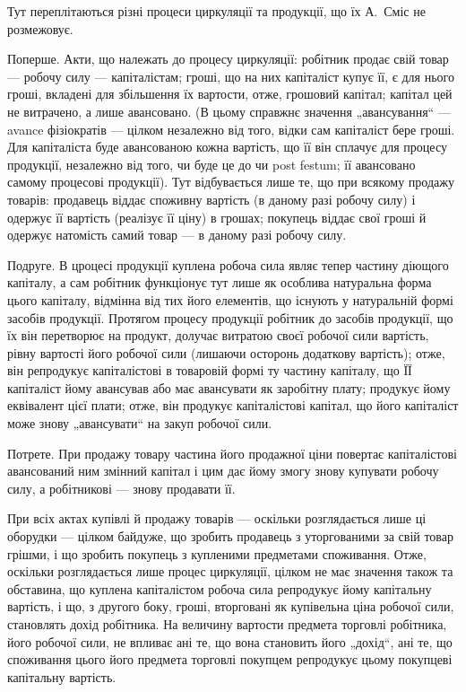 Тут переплітаються різні процеси циркуляції та продукції, що їх А.~Сміс не розмежовує.

Поперше. Акти, що належать до процесу циркуляції: робітник продає свій товар — робочу силу —
капіталістам; гроші, що на них капіталіст купує її, є для нього гроші, вкладені для збільшення їх
вартости, отже, грошовий капітал; капітал цей не витрачено, а лише авансовано. (В цьому справжнє
значення „авансування“ — avance фізіократів — цілком незалежно від того, відки сам капіталіст бере
гроші. Для капіталіста буде авансованою кожна вартість, що її він сплачує для процесу продукції,
незалежно від того, чи буде це до чи post festum; її авансовано самому процесові продукції). Тут
відбувається лише те, що при всякому продажу товарів: продавець віддає споживну вартість (в даному
разі робочу силу) і одержує її вартість (реалізує її ціну) в грошах; покупець віддає свої гроші й
одержує натомість самий товар — в даному разі робочу силу.

Подруге. В цроцесі продукції куплена робоча сила являє тепер частину діющого капіталу, а сам
робітник функціонує тут лише як особлива натуральна форма цього капіталу, відмінна від тих його
елементів, що існують у натуральній формі засобів продукції. Протягом процесу продукції робітник до
засобів продукції, що їх він перетворює на продукт, долучає витратою своєї робочої сили вартість,
рівну вартості його робочої
сили (лишаючи осторонь додаткову вартість); отже, він репродукує капіталістові в товаровій
формі ту частину капіталу, що ЇЇ капіталіст йому авансував або має авансувати як заробітну плату;
продукує йому еквівалент цієї плати; отже, він продукує капіталістові капітал, що його капіталіст
може знову „авансувати“ на закуп робочої сили.

Потрете. При продажу товару частина його продажної ціни повертає капіталістові авансований ним
змінний капітал і цим дає йому змогу знову купувати робочу силу, а робітникові — знову продавати її.

При всіх актах купівлі й продажу товарів — оскільки розглядається лише ці оборудки — цілком байдуже,
що зробить продавець з уторгованими за свій товар грішми, і що зробить покупець з купленими
предметами споживання. Отже, оскільки розглядається лише процес циркуляції, цілком не має значення
також та обставина, що куплена капіталістом робоча сила репродукує йому капітальну вартість, і що, з
другого боку,
гроші, вторговані як купівельна ціна робочої сили, становлять дохід робітника. На величину вартости
предмета торговлі робітника, його робочої сили, не впливає ані те, що вона становить його „дохід“,
ані те, що споживання цього його предмета торговлі покупцем репродукує цьому покупцеві капітальну
вартість.

